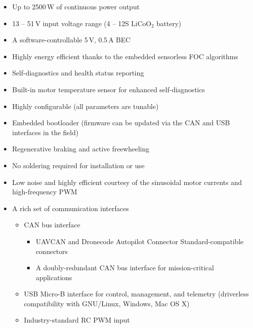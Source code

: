 \documentclass{zubaxdoc}
\begin{document}
\begin{titlepage}
\begin{itemize}[leftmargin=!,labelindent=!,itemindent=0pt]
    \item Up to 2500\,W of continuous power output
    \item 13 -- 51\,V input voltage range (4 -- 12S $\text{LiCoO}_\text{2}$ battery)
    \item A software-controllable 5\,V, 0.5\,A BEC
    \item Highly energy efficient thanks to the embedded sensorless FOC algorithms
    \item Self-diagnostics and health status reporting
    \item Built-in motor temperature sensor for enhanced self-diagnostics
    \item Highly configurable (all parameters are tunable)
    \item Embedded bootloader (firmware can be updated via the CAN and USB interfaces in the field)
    \item Regenerative braking and active freewheeling
    \item No soldering required for installation or use
    \item Low noise and highly efficient courtesy of the sinusoidal motor currents and high-frequency PWM
    \item A rich set of communication interfaces
     \begin{itemize}[label=--,itemindent=0pt]
        \item CAN bus interface
        \begin{itemize}[label=*,leftmargin=8pt,itemindent=0pt]
            \item UAVCAN and Dronecode Autopilot Connector Standard-compatible connectors
            \item A doubly-redundant CAN bus interface for mission-critical applications
        \end{itemize}
        \item USB Micro-B interface for control, management, and telemetry (driverless compatibility
              with GNU/Linux, Windows, Mac OS X)
        \item Industry-standard RC PWM input
    \end{itemize}
\end{itemize}


\end{titlepage}
\end{document}

